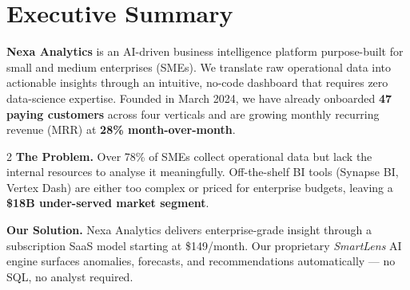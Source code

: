 \section{\sectionicon{\faBolt}Executive Summary}

\begin{tcolorbox}[highlight]
  \textbf{Nexa Analytics} is an AI-driven business intelligence platform purpose-built for
  small and medium enterprises (SMEs). We translate raw operational data into actionable
  insights through an intuitive, no-code dashboard that requires zero data-science expertise.
  Founded in March 2024, we have already onboarded \textbf{47 paying customers} across four
  verticals and are growing monthly recurring revenue (MRR) at \textbf{28\% month-over-month}.
\end{tcolorbox}

\begin{multicols}{2}
\textbf{The Problem.} Over 78\% of SMEs collect operational data but lack the internal
resources to analyse it meaningfully. Off-the-shelf BI tools (Synapse BI, Vertex Dash)
are either too complex or priced for enterprise budgets, leaving a \textbf{\$18B
under-served market segment}.

\columnbreak

\textbf{Our Solution.} Nexa Analytics delivers enterprise-grade insight through a
subscription SaaS model starting at \$149/month. Our proprietary \textit{SmartLens}
AI engine surfaces anomalies, forecasts, and recommendations automatically --- no SQL,
no analyst required.
\end{multicols}


